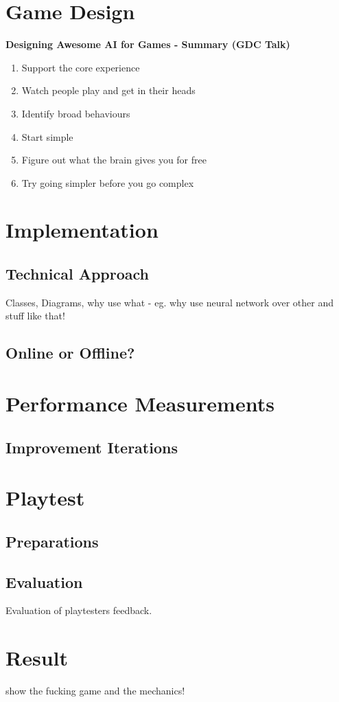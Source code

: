 \documentclass[MGS,Master,english]{twbook}%
\begin{document}
\section{Game Design}
\textbf{Designing Awesome AI for Games - Summary (GDC Talk)}
\begin{enumerate}
	\item Support the core experience
	\item Watch people play and get in their heads
	\item Identify broad behaviours
	\item Start simple
	\item Figure out what the brain gives you for free
	\item Try going simpler before you go complex
\end{enumerate}

\section{Implementation}
\subsection{Technical Approach}
Classes, Diagrams, why use what - eg. why use neural network over other and stuff like that!
\subsection{Online or Offline?}
\section{Performance Measurements}
\subsection{Improvement Iterations}
\section{Playtest}
\subsection{Preparations}
\subsection{Evaluation}
Evaluation of playtesters feedback.
\section{Result}
show the fucking game and the mechanics!
\end{document}
